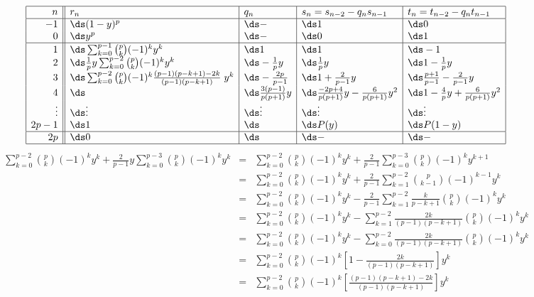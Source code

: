 \begin{enumerate}
\[\begin{array}{|r||l|l|l|l|}
  \hline
  n  & r_n   & q_n   & s_n=s_{n-2}-q_ns_{n-1} & t_n=t_{n-2}-q_nt_{n-1}  \\
  \hline
  -1  & \ds (1-y)^p
      & \ds -
      & \ds 1
      & \ds 0
      \\
   0  & \ds y^p
      & \ds -
      & \ds 0
      & \ds 1
      \\
  \hline
   1  & \ds  \sum_{k=0}^{p-1} {p\choose k}(-1)^k y^k
      & \ds  1
      & \ds  1
      & \ds -1
      \\
   2  & \ds \frac{1}{p} y \sum_{k=0}^{p-2} {p\choose k}(-1)^k y^k
      & \ds -\frac{1}{p} y
      & \ds \frac{1}{p} y
      & \ds 1 - \frac{1}{p} y
      \\
   3  & \ds \sum_{k=0}^{p-2} {p\choose k}(-1)^k
            \frac{(p-1)(p-k+1)-2k}{(p-1)(p-k+1)}\;y^k
      & \ds -\frac{2p}{p-1}
      & \ds 1 +\frac{2}{p-1}y
      & \ds \frac{p+1}{p-1} - \frac{2}{p-1}y
      \\
   4  & \ds
      & \ds \frac{3(p-1)}{p(p+1)} y
      & \ds \frac{-2p+4}{p(p+1)} y  -\frac{6}{p(p+1)} y^2
      & \ds 1 -\frac{4}{p} y + \frac{6}{p(p+1)} y^2
      \\
 \vdots & \ds \vdots
      & \ds \vdots
      & \ds \vdots
      & \ds \vdots
      \\
 2p-1 & \ds 1
      & \ds
      & \ds P(y)
      & \ds P(1-y)
      \\
  \hline
 2p   & \ds 0
      & \ds
      & \ds -
      & \ds -
      \\
  \hline
\end{array}\]
\begin{eqnarray*}
  \sum_{k=0}^{p-2} {p\choose k}(-1)^k y^k
  + \frac{2}{p-1} y \sum_{k=0}^{p-3} {p\choose k}(-1)^k y^k
    &=& \sum_{k=0}^{p-2} {p\choose k}(-1)^k y^k
      + \frac{2}{p-1} \sum_{k=0}^{p-3} {p\choose k}(-1)^k y^{k+1}
  \\&=& \sum_{k=0}^{p-2} {p\choose k}(-1)^k y^k
      + \frac{2}{p-1} \sum_{k=1}^{p-2} {p\choose k-1}(-1)^{k-1} y^{k}
  \\&=& \sum_{k=0}^{p-2} {p\choose k}(-1)^k y^k
      - \frac{2}{p-1} \sum_{k=1}^{p-2} \frac{k}{p-k+1}{p\choose k}(-1)^k y^{k}
  \\&=& \sum_{k=0}^{p-2} {p\choose k}(-1)^k y^k
      - \sum_{k=1}^{p-2} \frac{2k}{(p-1)(p-k+1)}{p\choose k}(-1)^k y^{k}
  \\&=& \sum_{k=0}^{p-2} {p\choose k}(-1)^k y^k
      - \sum_{k=0}^{p-2} \frac{2k}{(p-1)(p-k+1)}{p\choose k}(-1)^k y^{k}
  \\&=& \sum_{k=0}^{p-2} {p\choose k}(-1)^k
        \left[1-\frac{2k}{(p-1)(p-k+1)}\right]y^k
  \\&=& \sum_{k=0}^{p-2} {p\choose k}(-1)^k
        \left[\frac{(p-1)(p-k+1)-2k}{(p-1)(p-k+1)}\right]y^k
\end{eqnarray*}
\end{enumerate}


